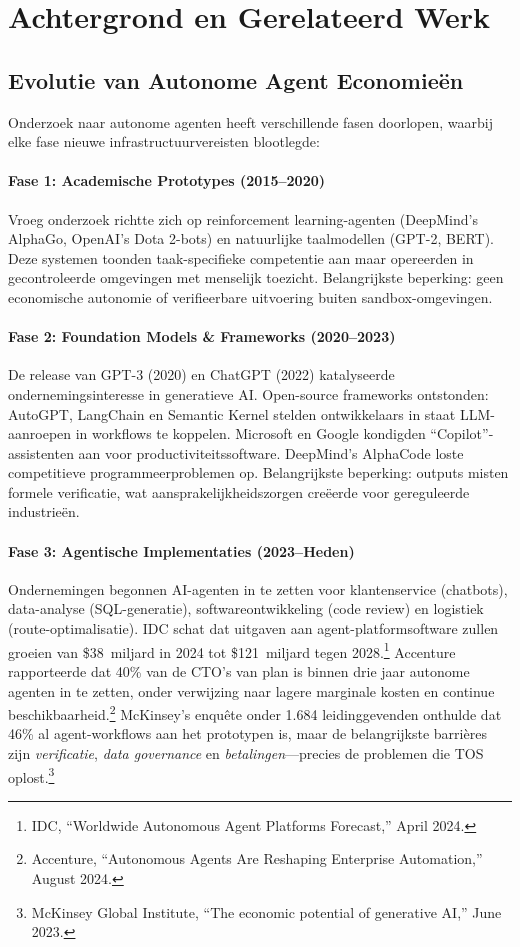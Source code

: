 \documentclass[11pt]{article}
\begin{document}
\section{Achtergrond en Gerelateerd Werk}
\subsection{Evolutie van Autonome Agent Economieën}
Onderzoek naar autonome agenten heeft verschillende fasen doorlopen, waarbij elke fase nieuwe infrastructuurvereisten blootlegde:

\paragraph{Fase 1: Academische Prototypes (2015--2020)} Vroeg onderzoek richtte zich op reinforcement learning-agenten (DeepMind's AlphaGo, OpenAI's Dota 2-bots) en natuurlijke taalmodellen (GPT-2, BERT). Deze systemen toonden taak-specifieke competentie aan maar opereerden in gecontroleerde omgevingen met menselijk toezicht. Belangrijkste beperking: geen economische autonomie of verifieerbare uitvoering buiten sandbox-omgevingen.

\paragraph{Fase 2: Foundation Models \& Frameworks (2020--2023)} De release van GPT-3 (2020) en ChatGPT (2022) katalyseerde ondernemingsinteresse in generatieve AI. Open-source frameworks ontstonden: AutoGPT, LangChain en Semantic Kernel stelden ontwikkelaars in staat LLM-aanroepen in workflows te koppelen. Microsoft en Google kondigden ``Copilot''-assistenten aan voor productiviteitssoftware. DeepMind's AlphaCode loste competitieve programmeerproblemen op. Belangrijkste beperking: outputs misten formele verificatie, wat aansprakelijkheidszorgen creëerde voor gereguleerde industrieën.

\paragraph{Fase 3: Agentische Implementaties (2023--Heden)} Ondernemingen begonnen AI-agenten in te zetten voor klantenservice (chatbots), data-analyse (SQL-generatie), softwareontwikkeling (code review) en logistiek (route-optimalisatie). IDC schat dat uitgaven aan agent-platformsoftware zullen groeien van \$38~miljard in 2024 tot \$121~miljard tegen 2028.\footnote{IDC, ``Worldwide Autonomous Agent Platforms Forecast,'' April 2024.} Accenture rapporteerde dat 40\% van de CTO's van plan is binnen drie jaar autonome agenten in te zetten, onder verwijzing naar lagere marginale kosten en continue beschikbaarheid.\footnote{Accenture, ``Autonomous Agents Are Reshaping Enterprise Automation,'' August 2024.} McKinsey's enquête onder 1.684 leidinggevenden onthulde dat 46\% al agent-workflows aan het prototypen is, maar de belangrijkste barrières zijn \emph{verificatie}, \emph{data governance} en \emph{betalingen}---precies de problemen die TOS oplost.\footnote{McKinsey Global Institute, ``The economic potential of generative AI,'' June 2023.}
\end{document}
